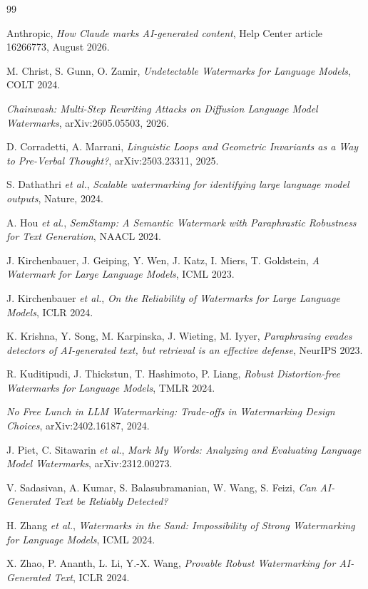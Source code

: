 \documentclass{article}
\theoremstyle{plain}
\theoremstyle{definition}
\numberwithin{equation}{section}
\begin{document}
\begin{thebibliography}{99}

 Anthropic, \emph{How Claude marks AI-generated
content}, Help Center article 16266773, August 2026.

 M. Christ, S. Gunn, O. Zamir, \emph{Undetectable
Watermarks for Language Models}, COLT 2024.

 \emph{Chainwash: Multi-Step Rewriting Attacks on
Diffusion Language Model Watermarks}, arXiv:2605.05503, 2026.

 D. Corradetti, A. Marrani, \emph{Linguistic Loops and
Geometric Invariants as a Way to Pre-Verbal Thought?},
arXiv:2503.23311, 2025.

 S. Dathathri \emph{et al.}, \emph{Scalable
watermarking for identifying large language model outputs},
Nature, 2024.

 A. Hou \emph{et al.}, \emph{SemStamp: A Semantic
Watermark with Paraphrastic Robustness for Text Generation},
NAACL 2024.

 J. Kirchenbauer, J. Geiping, Y. Wen, J. Katz, I. Miers,
T. Goldstein, \emph{A Watermark for Large Language Models}, ICML 2023.

 J. Kirchenbauer \emph{et al.}, \emph{On the Reliability
of Watermarks for Large Language Models}, ICLR 2024.

 K. Krishna, Y. Song, M. Karpinska, J. Wieting,
M. Iyyer, \emph{Paraphrasing evades detectors of AI-generated text, but
retrieval is an effective defense}, NeurIPS 2023.

 R. Kuditipudi, J. Thickstun, T. Hashimoto, P. Liang,
\emph{Robust Distortion-free Watermarks for Language Models},
TMLR 2024.

 \emph{No Free Lunch in LLM Watermarking: Trade-offs in
Watermarking Design Choices}, arXiv:2402.16187, 2024.

 J. Piet, C. Sitawarin \emph{et al.}, \emph{Mark My
Words: Analyzing and Evaluating Language Model Watermarks},
arXiv:2312.00273.

 V. Sadasivan, A. Kumar, S. Balasubramanian, W. Wang,
S. Feizi, \emph{Can AI-Generated Text be Reliably Detected?}

 H. Zhang \emph{et al.}, \emph{Watermarks in the Sand:
Impossibility of Strong Watermarking for Language Models}, ICML 2024.

 X. Zhao, P. Ananth, L. Li, Y.-X. Wang, \emph{Provable
Robust Watermarking for AI-Generated Text}, ICLR 2024.

\end{thebibliography}
\end{document}
